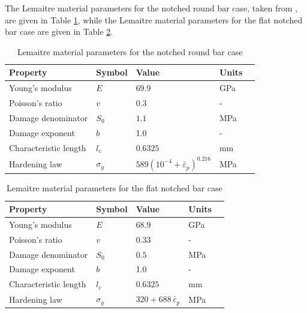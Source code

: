 \documentclass[sn-mathphys,Numbered]{sn-jnl}%
\begin{document}
The Lemaitre material parameters for the notched round bar case, taken from \citet{cesar_de_sa_damage_2006}, are given in Table \ref{table:NRB_material_properties_lemaitre}, while the Lemaitre material parameters for the flat notched bar case are given in Table \ref{table:FNB_material_properties_lemaitre}.
\begin{table}[htb]
	\centering
		\begin{tabular}{lllll} \hline
			Property & Symbol & Value & Units \\ \hline 
			Young's modulus & $E$ & $69.9$ & GPa \\
			Poisson's ratio & $v$ & $0.3$  & - \\
			Damage denominator & $S_0$ & $1.1$ & MPa  \\
			Damage exponent & $b$ & 1.0 & - \\
			Characteristic length & $l_c$ & $0.6325$ & mm  \\
			Hardening law & $\sigma_y$ & $589({10^{-4} +\bar{\varepsilon}}_p)^{0.216}$ & MPa \\
			\hline
		\end{tabular}
	\caption{Lemaitre material parameters for the notched round bar case}
	\label{table:NRB_material_properties_lemaitre}
\end{table}
\begin{table}[htb]
	\centering
		\begin{tabular}{lllll} \hline
			Property & Symbol & Value & Units  \\ \hline 
			Young's modulus & $E$ & $68.9$ & GPa \\
			Poisson's ratio & $v$ & $0.33$  & - \\
			Damage denominator & $S_0$ & $0.5$ & MPa  \\
			Damage exponent & $b$ & 1.0 & -  \\
			Characteristic length & $l_c$ & $0.6325$ & mm  \\
			Hardening law & $\sigma_y$ & $320+688 \, \bar{\varepsilon}_p$ & MPa \\
			\hline
		\end{tabular}
	\caption{Lemaitre material parameters for the flat notched bar case}
	\label{table:FNB_material_properties_lemaitre}
\end{table}
\end{document}
